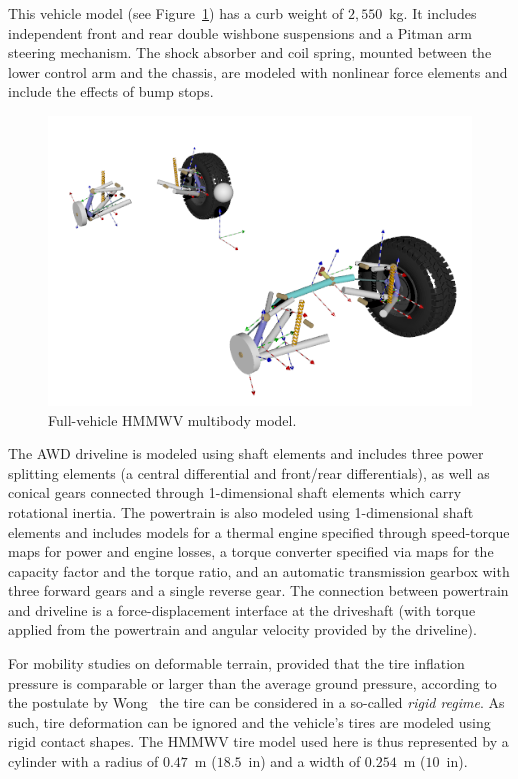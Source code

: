 \documentclass[12pt,onecolumn]{report}
\newcommand{\CHRONO}{{\sffamily{{Chrono}}}}
\begin{document}
This vehicle model (see Figure~\ref{fig:hmmwv}) has a curb weight of $2,550$~kg.
%
It includes independent front and rear double wishbone suspensions and a Pitman arm steering mechanism. The shock absorber and coil spring, mounted between the lower control arm and the chassis, are modeled with {\CHRONO} nonlinear force elements and include the effects of bump stops.
%
\begin{figure}
	\centering
	\includegraphics[width=\columnwidth]{Figs/hmmwv_bodies.png}
	\caption{\small Full-vehicle HMMWV multibody model.}  
	\label{fig:hmmwv}
\end{figure}

The AWD driveline is modeled using {\CHRONO} shaft elements and includes three power splitting elements (a central differential and front/rear differentials), as well as conical gears connected through 1-dimensional shaft elements which carry rotational inertia. 
%
The powertrain is also modeled using 1-dimensional shaft elements and includes models for a thermal engine specified through speed-torque maps for power and engine losses, a torque converter specified via maps for the capacity factor and the torque ratio, and an automatic transmission gearbox with three forward gears and a single reverse gear.
%
The connection between powertrain and driveline is a force-displacement interface at the driveshaft (with torque applied from the powertrain and angular velocity provided by the driveline).

For mobility studies on deformable terrain, provided that the tire inflation pressure is comparable or larger than the average ground pressure, according to the postulate by Wong~\cite{wong93} the tire can be considered in a so-called {\em rigid regime}.  As such, tire deformation can be ignored and the vehicle's tires are modeled using rigid contact shapes.  The HMMWV tire model used here is thus represented by a cylinder with a radius of $0.47$~m ($18.5$~in) and a width of $0.254$~m ($10$~in).
\end{document}
